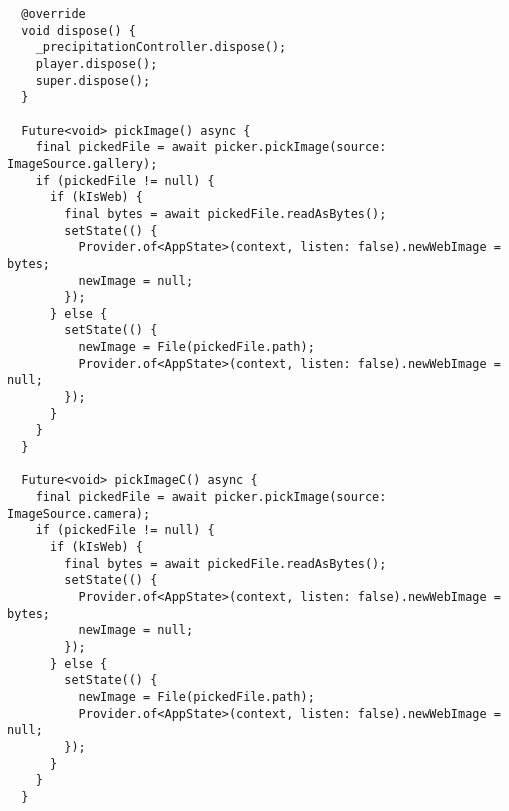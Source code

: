 \begin{verbatim}
  @override
  void dispose() {
    _precipitationController.dispose();
    player.dispose();
    super.dispose();
  }

  Future<void> pickImage() async {
    final pickedFile = await picker.pickImage(source: ImageSource.gallery);
    if (pickedFile != null) {
      if (kIsWeb) {
        final bytes = await pickedFile.readAsBytes();
        setState(() {
          Provider.of<AppState>(context, listen: false).newWebImage = bytes;
          newImage = null;
        });
      } else {
        setState(() {
          newImage = File(pickedFile.path);
          Provider.of<AppState>(context, listen: false).newWebImage = null;
        });
      }
    }
  }

  Future<void> pickImageC() async {
    final pickedFile = await picker.pickImage(source: ImageSource.camera);
    if (pickedFile != null) {
      if (kIsWeb) {
        final bytes = await pickedFile.readAsBytes();
        setState(() {
          Provider.of<AppState>(context, listen: false).newWebImage = bytes;
          newImage = null;
        });
      } else {
        setState(() {
          newImage = File(pickedFile.path);
          Provider.of<AppState>(context, listen: false).newWebImage = null;
        });
      }
    }
  }


\end{verbatim}

